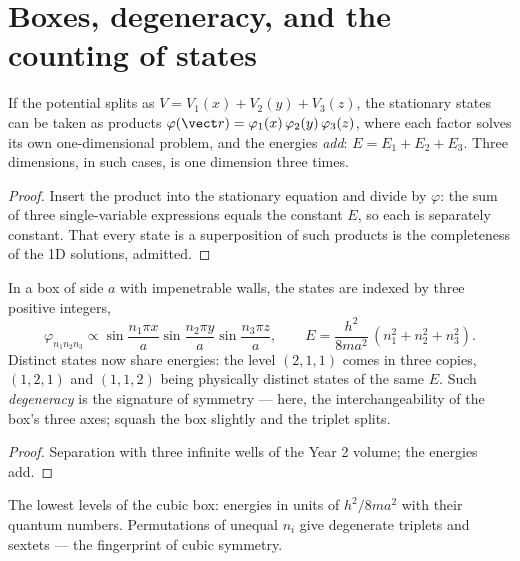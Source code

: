 \section{Boxes, degeneracy, and the counting of states}

\begin{theorem}\label{thm:b3:schrodinger-three-dimensions:separation}
If the potential splits as $V = V_1(x) + V_2(y) + V_3(z)$, the
stationary states can be taken as products
$\varphi(\vect r) = \varphi_1(x)\,\varphi_2(y)\,\varphi_3(z)$, where
each factor solves its own one-dimensional problem, and the energies
\emph{add}: $E = E_1 + E_2 + E_3$. Three dimensions, in such cases,
is one dimension three times.
\end{theorem}

\begin{proof}
Insert the product into the stationary equation and divide by
$\varphi$: the sum of three single-variable expressions equals the
constant $E$, so each is separately constant. That every state is a
superposition of such products is the completeness of the 1D
solutions, admitted.
\end{proof}

\begin{proposition}\label{prop:b3:schrodinger-three-dimensions:box}
In a box of side $a$ with impenetrable walls, the states are indexed
by three positive integers,
\[
\varphi_{n_1n_2n_3} \propto
\sin\frac{n_1\pi x}{a}\sin\frac{n_2\pi y}{a}\sin\frac{n_3\pi z}{a} ,
\qquad
E = \frac{h^2}{8ma^2}\,(n_1^2 + n_2^2 + n_3^2) .
\]
Distinct states now share energies: the level $(2,1,1)$ comes in
three copies, $(1,2,1)$ and $(1,1,2)$ being physically distinct
states of the same $E$. Such \emph{degeneracy} is the signature of
symmetry --- here, the interchangeability of the box's three axes;
squash the box slightly and the triplet splits.
\end{proposition}

\begin{proof}
Separation with three infinite wells of the Year 2 volume; the
energies add.
\end{proof}

\begin{omfigure}

{\small The lowest levels of the cubic box: energies in units of
$h^2/8ma^2$ with their quantum numbers. Permutations of unequal
$n_i$ give degenerate triplets and sextets --- the fingerprint of
cubic symmetry.}
\end{omfigure}

